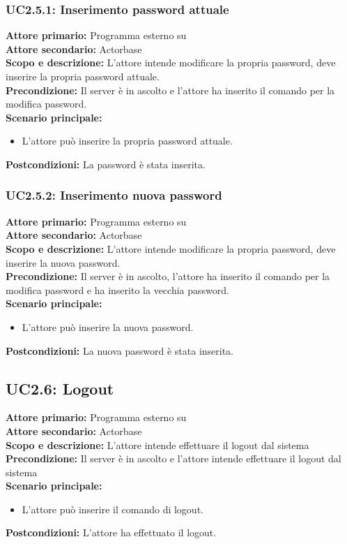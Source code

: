 \documentclass{scalatekids-article}
\begin{document}
\subsubsection{UC2.5.1: Inserimento password attuale}

\textbf{Attore primario:} Programma esterno su \\
\textbf{Attore secondario:} Actorbase\\
\textbf{Scopo e descrizione:} L'attore intende modificare la propria password, deve inserire la propria password attuale.\\
\textbf{Precondizione:} Il server è in ascolto e l'attore ha inserito il comando per la modifica password.\\
\textbf{Scenario principale:}
\begin{itemize}
\item L'attore può inserire la propria password attuale.
\end{itemize}
\textbf{Postcondizioni:} La password è stata inserita.

\subsubsection{UC2.5.2: Inserimento nuova password}

\textbf{Attore primario:} Programma esterno su \\
\textbf{Attore secondario:} Actorbase\\
\textbf{Scopo e descrizione:} L'attore intende modificare la propria password, deve inserire la nuova password.\\
\textbf{Precondizione:} Il server è in ascolto, l'attore ha inserito il comando per la modifica password e ha inserito la vecchia password.\\
\textbf{Scenario principale:}
\begin{itemize}
\item L'attore può inserire la nuova password.
\end{itemize}
\textbf{Postcondizioni:} La nuova password è stata inserita.

\subsection{UC2.6: Logout}

\textbf{Attore primario:} Programma esterno su \\
\textbf{Attore secondario:} Actorbase\\
\textbf{Scopo e descrizione:} L'attore intende effettuare il logout dal sistema\\
\textbf{Precondizione:} Il server è in ascolto e l'attore intende effettuare il logout dal sistema\\
\textbf{Scenario principale:}
\begin{itemize}
\item L'attore può inserire il comando di logout.
\end{itemize}
\textbf{Postcondizioni:} L'attore ha effettuato il logout.
\end{document}
